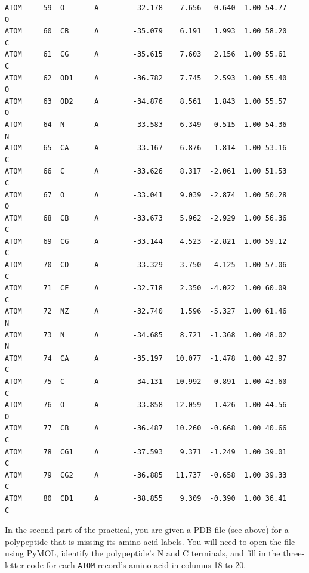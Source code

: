 \documentclass[
  letterpaper,
  DIV=11,
  numbers=noendperiod]{scrreprt}
\begin{document}
\begin{verbatim}
ATOM     59  O       A        -32.178    7.656   0.640  1.00 54.77           O
ATOM     60  CB      A        -35.079    6.191   1.993  1.00 58.20           C
ATOM     61  CG      A        -35.615    7.603   2.156  1.00 55.61           C
ATOM     62  OD1     A        -36.782    7.745   2.593  1.00 55.40           O
ATOM     63  OD2     A        -34.876    8.561   1.843  1.00 55.57           O
ATOM     64  N       A        -33.583    6.349  -0.515  1.00 54.36           N
ATOM     65  CA      A        -33.167    6.876  -1.814  1.00 53.16           C
ATOM     66  C       A        -33.626    8.317  -2.061  1.00 51.53           C
ATOM     67  O       A        -33.041    9.039  -2.874  1.00 50.28           O
ATOM     68  CB      A        -33.673    5.962  -2.929  1.00 56.36           C
ATOM     69  CG      A        -33.144    4.523  -2.821  1.00 59.12           C
ATOM     70  CD      A        -33.329    3.750  -4.125  1.00 57.06           C
ATOM     71  CE      A        -32.718    2.350  -4.022  1.00 60.09           C
ATOM     72  NZ      A        -32.740    1.596  -5.327  1.00 61.46           N
ATOM     73  N       A        -34.685    8.721  -1.368  1.00 48.02           N
ATOM     74  CA      A        -35.197   10.077  -1.478  1.00 42.97           C
ATOM     75  C       A        -34.131   10.992  -0.891  1.00 43.60           C
ATOM     76  O       A        -33.858   12.059  -1.426  1.00 44.56           O
ATOM     77  CB      A        -36.487   10.260  -0.668  1.00 40.66           C
ATOM     78  CG1     A        -37.593    9.371  -1.249  1.00 39.01           C
ATOM     79  CG2     A        -36.885   11.737  -0.658  1.00 39.33           C
ATOM     80  CD1     A        -38.855    9.309  -0.390  1.00 36.41           C
\end{verbatim}

In the second part of the practical, you are given a PDB file (see
above) for a polypeptide that is missing its amino acid labels. You will
need to open the file using PyMOL, identify the polypeptide's N and C
terminals, and fill in the three-letter code for each \texttt{ATOM}
record's amino acid in columns 18 to 20.
\end{document}
